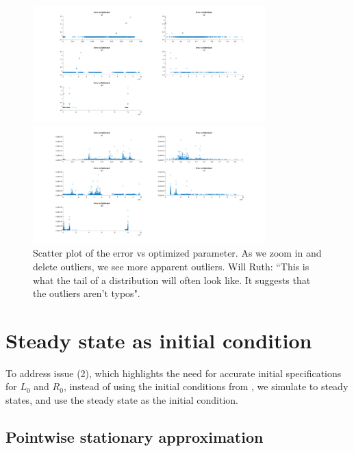 \documentclass{article}
\begin{document}
\begin{figure}
	\centering
	\includegraphics[width=0.8\textwidth]{ScatterPlotErrorVsOptimalOutput_Cut2.png}  
	
	
	\includegraphics[width=0.8\textwidth]{ScatterPlotErrorVsOptimalOutput_Cut3.png}
	
	\caption{Scatter plot of the error vs optimized parameter. As we zoom in and delete outliers, we see more apparent outliers.  Will Ruth: ``This is what the tail of a distribution will often look like. It suggests that the outliers aren't typos".}
	
	\label{fig:ScatterErrorVsOptimizedParam}
\end{figure}


\section{Steady state as initial condition}

To address issue (2), which highlights the need for accurate initial specifications for $L_0$ and $R_0$, instead of using the initial conditions from \cite{GuoWu}, we simulate to steady states, and use the steady state as the initial condition.

\subsection{Pointwise stationary approximation}
\end{document}
